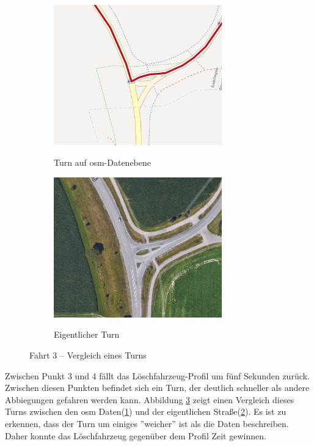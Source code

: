 \begin{figure}[htb]
\centering
\begin{subfigure}{0.49\textwidth}
\centering
\includegraphics[width = 0.80\textwidth]{../media/Fahrt3_Turn.png} \\
\caption{Turn auf \gls{osm}-Datenebene}
\label{fig:turnosm}
\end{subfigure}
\begin{subfigure}{0.49\textwidth}
\centering
\includegraphics[width = 0.80\textwidth]{../media/Fahrt3_actualturn.png} \\
\caption{Eigentlicher Turn}
\label{fig:turnworld}
\end{subfigure}
\caption{Fahrt 3 -- Vergleich eines Turns}
\label{fig:turn}
\end{figure}

Zwischen Punkt 3 und 4 fällt das Löschfahrzeug-Profil um fünf Sekunden zurück.
Zwischen diesen Punkten befindet sich ein Turn, der deutlich schneller als andere Abbiegungen gefahren werden kann.
Abbildung \ref{fig:turn} zeigt einen Vergleich dieses Turns zwischen den \gls{osm} Daten(\ref{fig:turnosm}) und der eigentlichen Straße(\ref{fig:turnworld}).
Es ist zu erkennen, dass der Turn um einiges ''weicher'' ist als die Daten beschreiben.
Daher konnte das Löschfahrzeug gegenüber dem Profil Zeit gewinnen.

